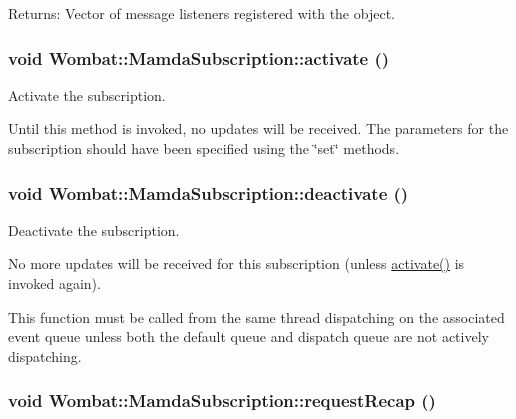 \begin{Desc}
\item[Returns:]Vector of message listeners registered with the object. \end{Desc}
\hypertarget{classWombat_1_1MamdaSubscription_50f691571f680c77ad949f5c162afe35}{
\subsubsection[activate]{\setlength{\rightskip}{0pt plus 5cm}void Wombat::Mamda\-Subscription::activate ()}}
\label{classWombat_1_1MamdaSubscription_50f691571f680c77ad949f5c162afe35}


Activate the subscription. 

Until this method is invoked, no updates will be received. The parameters for the subscription should have been specified using the \char`\"{}set\char`\"{} methods. \hypertarget{classWombat_1_1MamdaSubscription_c4466ddd103f5ba5b0bf3d6f13a327c3}{
\subsubsection[deactivate]{\setlength{\rightskip}{0pt plus 5cm}void Wombat::Mamda\-Subscription::deactivate ()}}
\label{classWombat_1_1MamdaSubscription_c4466ddd103f5ba5b0bf3d6f13a327c3}


Deactivate the subscription. 

No more updates will be received for this subscription (unless \hyperlink{classWombat_1_1MamdaSubscription_50f691571f680c77ad949f5c162afe35}{activate()} is invoked again).

This function must be called from the same thread dispatching on the associated event queue unless both the default queue and dispatch queue are not actively dispatching. \hypertarget{classWombat_1_1MamdaSubscription_454ece35b510c1ccd4b955d99c1d97df}{
\subsubsection[requestRecap]{\setlength{\rightskip}{0pt plus 5cm}void Wombat::Mamda\-Subscription::request\-Recap ()}}
\label{classWombat_1_1MamdaSubscription_454ece35b510c1ccd4b955d99c1d97df}


